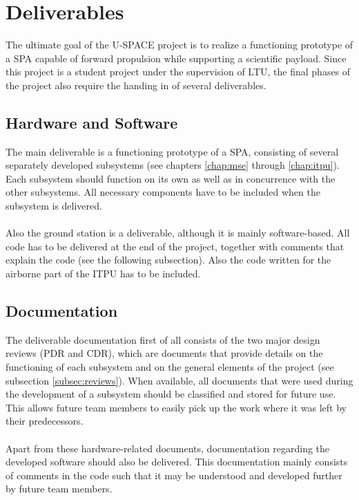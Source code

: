 \section{Deliverables}
%
The ultimate goal of the \ac{U-SPACE} project is to realize a functioning prototype of a \ac{SPA} capable of forward propulsion while supporting a scientific payload. Since this project is a student project under the supervision of \ac{LTU}, the final phases of the project also require the handing in of several deliverables.
%
\subsection{Hardware and Software}
%
The main deliverable is a functioning prototype of a \ac{SPA}, consisting of several separately developed subsystems (see chapters \ref{chap:mse} through \ref{chap:itpu}). Each subsystem should function on its own as well as in concurrence with the other subsystems. All necessary components have to be included when the subsystem is delivered.
\\
\\
Also the ground station is a deliverable, although it is mainly software-based. All code has to be delivered at the end of the project, together with comments that explain the code (see the following subsection). Also the code written for the airborne part of the \ac{ITPU} has to be included.
%
\subsection{Documentation}
%
The deliverable documentation first of all consists of the two major design reviews (\ac{PDR} and \ac{CDR}), which are documents that provide details on the functioning of each subsystem and on the general elements of the project (see subsection \ref{subsec:reviews}). When available, all documents that were used during the development of a subsystem should be classified and stored for future use. This allows future team members to easily pick up the work where it was left by their predecessors.
\\
\\
Apart from these hardware-related documents, documentation regarding the developed software should also be delivered. This documentation mainly consists of comments in the code such that it may be understood and developed further by future team members.